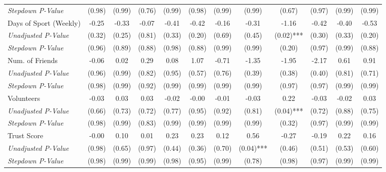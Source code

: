 \begin{tabular}{l c c c c c c c c c c c}
\quad \textit{Stepdown P-Value} & (0.98) & (0.99) & (0.76) & (0.99) & (0.98) & (0.99) & (0.99) & (0.67) & (0.97) & (0.99) & (0.99) \\
Days of Sport (Weekly) & -0.25 & -0.33 & -0.07 & -0.41 & -0.42 & -0.16 & -0.31 & -1.16 & -0.42 & -0.40 & -0.53 \\
\quad \textit{Unadjusted P-Value} & (0.32) & (0.25) & (0.81) & (0.33) & (0.20) & (0.69) & (0.45) & (0.02)*** & (0.30) & (0.33) & (0.20) \\
\quad \textit{Stepdown P-Value} & (0.96) & (0.89) & (0.88) & (0.98) & (0.88) & (0.99) & (0.99) & (0.20) & (0.97) & (0.99) & (0.88) \\
Num. of Friends & -0.06 & 0.02 & 0.29 & 0.08 & 1.07 & -0.71 & -1.35 & -1.95 & -2.17 & 0.61 & 0.91 \\
\quad \textit{Unadjusted P-Value} & (0.96) & (0.99) & (0.82) & (0.95) & (0.57) & (0.76) & (0.39) & (0.38) & (0.40) & (0.81) & (0.71) \\
\quad \textit{Stepdown P-Value} & (0.98) & (0.99) & (0.92) & (0.99) & (0.99) & (0.99) & (0.99) & (0.97) & (0.97) & (0.99) & (0.99) \\
Volunteers & -0.03 & 0.03 & 0.03 & -0.02 & -0.00 & -0.01 & -0.03 & 0.22 & -0.03 & -0.02 & 0.03 \\
\quad \textit{Unadjusted P-Value} & (0.66) & (0.73) & (0.72) & (0.77) & (0.95) & (0.92) & (0.81) & (0.04)*** & (0.72) & (0.88) & (0.75) \\
\quad \textit{Stepdown P-Value} & (0.98) & (0.99) & (0.83) & (0.99) & (0.99) & (0.99) & (0.99) & (0.32) & (0.97) & (0.99) & (0.99) \\
Trust Score & -0.00 & 0.10 & 0.01 & 0.23 & 0.23 & 0.12 & 0.56 & -0.27 & -0.19 & 0.22 & 0.16 \\
\quad \textit{Unadjusted P-Value} & (0.98) & (0.65) & (0.97) & (0.44) & (0.36) & (0.70) & (0.04)*** & (0.46) & (0.51) & (0.53) & (0.60) \\
\quad \textit{Stepdown P-Value} & (0.98) & (0.99) & (0.99) & (0.98) & (0.95) & (0.99) & (0.78) & (0.98) & (0.97) & (0.99) & (0.99) \\
\bottomrule
\end{tabular}
